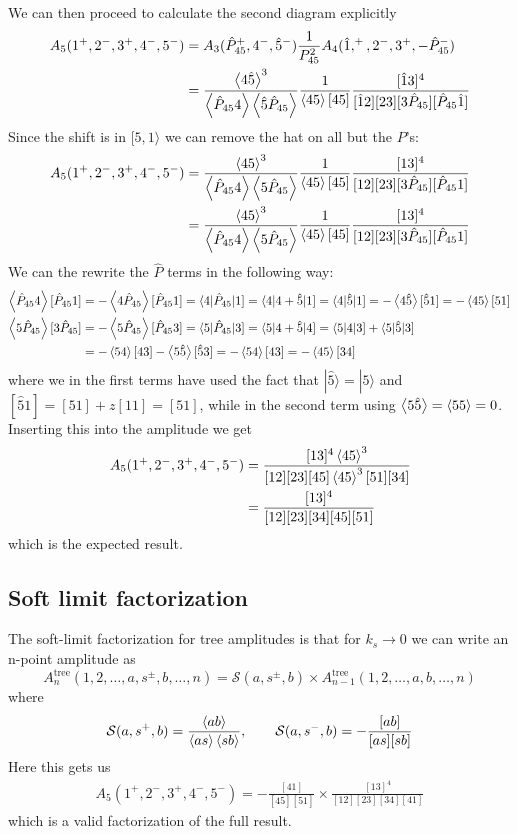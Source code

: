 \documentclass[a4paper,12pt]{article}
\begin{document}
We can then proceed to calculate the second diagram explicitly
\begin{align*}
A_{5}(1^+,2^-,3^+,4^-,5^-)&=A_3(\hat{P}_{45}^+,4^-,\hat 5^-)\frac{1}{P_{45}^2}A_4(\hat 1,^+,2^-,3^+,-\hat P_{45}^-)\\
&=\frac{\expval{4\hat 5}^3}{\expval{\hat P_{45}4}\expval{\hat 5\hat P_{45}}}\frac{1}{\expval{45}[45]}\frac{[\hat 13]^4}{[\hat 12][23][3\hat P_{45}][\hat P_{45}\hat 1]}
\end{align*}
Since the shift is in $[5,1\rangle$ we can remove the hat on all but the $P$'s: 
\begin{align*}
A_{5}(1^+,2^-,3^+,4^-,5^-)
&=\frac{\expval{4 5}^3}{\expval{\hat P_{45}4}\expval{5\hat P_{45}}}\frac{1}{\expval{45}[45]}\frac{[13]^4}{[12][23][3\hat P_{45}][\hat P_{45} 1]}\\
&=\frac{\expval{4 5}^3}{\expval{\hat P_{45}4}\expval{5\hat P_{45}}}\frac{1}{\expval{45}[45]}\frac{[13]^4}{[12][23][3\hat P_{45}][\hat P_{45} 1]}
\end{align*}
We can the rewrite the $\hat P$ terms in the following way:
\begin{align*}
\expval{\hat P_{45}4}[\hat P_{45}1]&=-\expval{4\hat P_{45}}[\hat P_{45}1]=\langle 4|\hat P_{45}|1]=\langle 4|4+\hat{5}|1]=\langle 4|\hat{5}|1]=-\expval{4\hat 5}[\hat 5 1]=-\expval{45}[5 1]\\
\expval{5\hat P_{45}}[3\hat P_{45}]&=-\expval{5\hat P_{45}}[\hat P_{45}3]=\langle 5|\hat P_{45}|3]=\langle 5|4+\hat{5}|4]=\langle 5|4|3]+\langle 5|\hat 5|3]\\
&=-\expval{54}[ 4 3]-\expval{5\hat 5}[ \hat 5 3]=-\expval{54}[ 4 3]=-\expval{45}[34]
\end{align*}
where we in the first terms have used the fact that $|\hat 5\rangle=|5\rangle$ and $[\hat 5 1]=[51]+z[11]=[51]$, while in the second term using $\expval{5\hat 5}=\expval{5 5}=0$. Inserting this into the amplitude we get
\begin{align*}
A_{5}(1^+,2^-,3^+,4^-,5^-)
&=\frac{[13]^4\expval{45}^3}{[12][23][45]\expval{45}^3[51][34]}\\
&=\frac{[13]^4}{[12][23][34][45][51]}
\end{align*}
which is the expected result.
\subsection{Soft limit factorization}
The soft-limit factorization for tree amplitudes is that for $k_s\to 0$ we can write an n-point amplitude as
\begin{equation}
A_n^{\text{tree}}(1,2,\dots,a,s^\pm,b,\dots,n)=\mathcal{S}(a,s^\pm,b)\times A_{n-1}^{\text{tree}}(1,2,\dots,a,b,\dots,n)
\end{equation}
where
\begin{equation}
\mathcal{S}(a,s^+,b)=\frac{\expval{ab}}{\expval{as}\expval{sb}},\qquad \mathcal{S}(a,s^-,b)=-\frac{[ab]}{[as][sb]}
\end{equation}
Here this gets us
\begin{align*}
A_{5}(1^+,2^-,3^+,4^-,5^-)=-\frac{[41]}{[45][51]}\times\frac{[13]^4}{[12][23][34][41]}
\end{align*}
which is a valid factorization of the full result.
\end{document}
